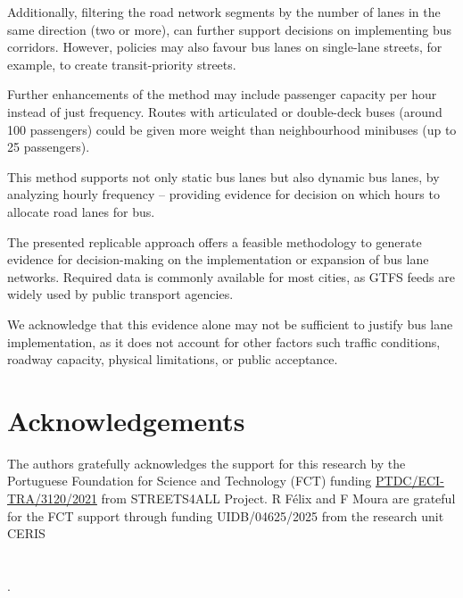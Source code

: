 \documentclass[
]{article}
\providecommand{\DIFadd}[1]{{\protect\color{green}{#1}}} %
\providecommand{\DIFaddbegin}{} %
\providecommand{\DIFaddend}{} %
\newcommand{\DIFaddincludegraphics}[2][]{{\color{blue}\fbox{\DIFOincludegraphics[#1]{#2}}}} %
\DeclareRobustCommand{\DIFaddbegin}{\DIFOaddbegin \let\includegraphics\DIFaddincludegraphics} %
\DeclareRobustCommand{\DIFaddend}{\DIFOaddend \let\includegraphics\DIFOincludegraphics} %
\begin{document}
Additionally, filtering the road network segments by the number of lanes in the same direction (two or more), can further support decisions on implementing bus corridors.
However, policies may also favour bus lanes on single-lane streets, for example, to create transit-priority streets.

Further enhancements of the method may include passenger capacity per hour instead of just frequency. Routes with articulated or double-deck buses (around 100 passengers) could be given more weight than neighbourhood minibuses (up to 25 passengers).

This method supports not only static bus lanes but also dynamic bus lanes, by analyzing hourly frequency -- providing evidence for decision on which hours to allocate road lanes for bus.

The presented replicable approach offers a feasible methodology to generate evidence for decision-making on the implementation or expansion of bus lane networks.
Required data is commonly available for most cities, as GTFS feeds are widely used by public transport agencies.

We acknowledge that this evidence alone may not be sufficient to justify bus lane implementation, as it does not account for other factors such traffic conditions, roadway capacity, physical limitations, or public acceptance.

\section*{Acknowledgements}\label{acknowledgements}

The authors gratefully acknowledges the support for this research by the Portuguese Foundation for Science and Technology (FCT) funding \href{https://doi.org/10.54499/PTDC/ECI-TRA/3120/2021}{PTDC/ECI-TRA/3120/2021} from STREETS4ALL Project.
R Félix and F Moura are grateful for the FCT support through funding UIDB/04625/2025 from the research unit CERIS\DIFaddbegin \DIFadd{.
}

\section*{\DIFadd{Reproducibility}}\label{reproducibility}
\addcontentsline{toc}{section}{\DIFadd{Reproducibility}}

\DIFadd{All code, data snapshots, and environment descriptors required to reproduce these results are archived at }\href{https://github.com/U-Shift/busclar}{\DIFadd{U-Shift/busclar}} \DIFadd{code repository }\citep{busclar0825}\DIFadd{.
The R and packages' versions used are listed in the }\texttt{\DIFadd{renv.lock}} \DIFadd{file.
For this article, we used }\texttt{\DIFadd{GTFShift}} \DIFadd{version v0.7.
}

\DIFadd{Please refer to the assets available at }\href{https://github.com/U-Shift/busclar/releases/tag/0.8}{\DIFadd{release version 0.8}}\DIFadd{, to get the data and the results from this paper, for instance the used GTFS files, as they change periodically}\DIFaddend .

\renewcommand\refname{References}
  
\end{document}
